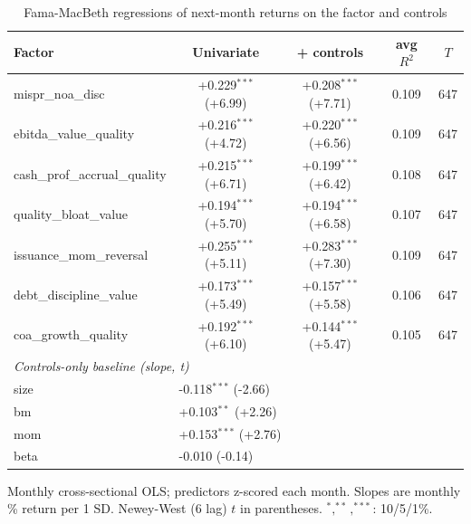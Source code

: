 \begin{table}[htbp]\centering
\caption{Fama-MacBeth regressions of next-month returns on the factor and controls}
\label{tab:fm}
\begin{threeparttable}\footnotesize
\begin{tabular}{lcccc}
\toprule
Factor & Univariate & + controls & avg $R^2$ & $T$ \\
\midrule
mispr\_noa\_disc & +0.229$^{***}$ (+6.99) & +0.208$^{***}$ (+7.71) & 0.109 & 647 \\
ebitda\_value\_quality & +0.216$^{***}$ (+4.72) & +0.220$^{***}$ (+6.56) & 0.109 & 647 \\
cash\_prof\_accrual\_quality & +0.215$^{***}$ (+6.71) & +0.199$^{***}$ (+6.42) & 0.108 & 647 \\
quality\_bloat\_value & +0.194$^{***}$ (+5.70) & +0.194$^{***}$ (+6.58) & 0.107 & 647 \\
issuance\_mom\_reversal & +0.255$^{***}$ (+5.11) & +0.283$^{***}$ (+7.30) & 0.109 & 647 \\
debt\_discipline\_value & +0.173$^{***}$ (+5.49) & +0.157$^{***}$ (+5.58) & 0.106 & 647 \\
coa\_growth\_quality & +0.192$^{***}$ (+6.10) & +0.144$^{***}$ (+5.47) & 0.105 & 647 \\
\midrule
\multicolumn{5}{l}{\textit{Controls-only baseline (slope, t)}} \\
size & \multicolumn{2}{l}{-0.118$^{***}$ (-2.66)} & & \\
bm & \multicolumn{2}{l}{+0.103$^{**}$ (+2.26)} & & \\
mom & \multicolumn{2}{l}{+0.153$^{***}$ (+2.76)} & & \\
beta & \multicolumn{2}{l}{-0.010 (-0.14)} & & \\
\bottomrule
\end{tabular}
\begin{tablenotes}\footnotesize
\item Monthly cross-sectional OLS; predictors z-scored each month. Slopes are monthly \% return per 1 SD. Newey-West (6 lag) $t$ in parentheses. $^{*},^{**},^{***}$: 10/5/1\%.
\end{tablenotes}
\end{threeparttable}
\end{table}